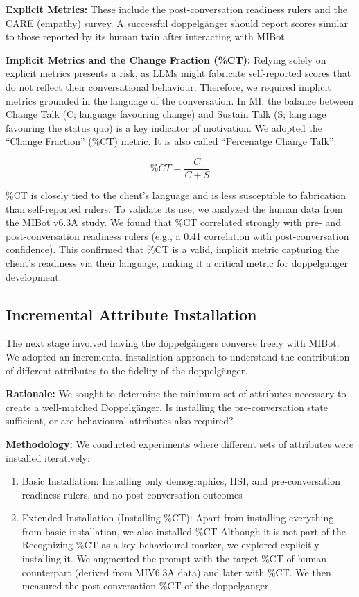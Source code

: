 \textbf{Explicit Metrics:} These include the post-conversation readiness rulers and the CARE (empathy) survey. A successful doppelgänger should report scores similar to those reported by its human twin after interacting with MIBot.

\textbf{Implicit Metrics and the Change Fraction (\%CT):} Relying solely on explicit metrics presents a risk, as LLMs might fabricate self-reported scores that do not reflect their conversational behaviour. Therefore, we required implicit metrics grounded in the language of the conversation. In MI, the balance between Change Talk (C; language favouring change) and Sustain Talk (S; language favouring the status quo) is a key indicator of motivation. We adopted the ``Change Fraction'' (\%CT) metric. It is also called ``Percenatge Change Talk'':

$$ \%CT = \frac{C}{C + S} $$

\%CT is closely tied to the client's language and is less susceptible to fabrication than self-reported rulers. To validate its use, we analyzed the human data from the MIBot v6.3A study. We found that \%CT correlated strongly with pre- and post-conversation readiness rulers (e.g., a 0.41 correlation with post-conversation confidence). This confirmed that \%CT is a valid, implicit metric capturing the client's readiness via their language, making it a critical metric for doppelgänger development.


\subsection{Incremental Attribute Installation}
\label{sec:incremental_installation}
The next stage involved having the doppelgängers converse freely with MIBot. We adopted an incremental installation approach to understand the contribution of different attributes to the fidelity of the doppelgänger.

\textbf{Rationale:}
We sought to determine the minimum set of attributes necessary to create a well-matched Doppelgänger. Is installing the pre-conversation state sufficient, or are behavioural attributes also required?

\textbf{Methodology:}
We conducted experiments where different sets of attributes were installed iteratively:

\begin{enumerate}
    \item Basic Installation: Installing only demographics, HSI, and pre-conversation readiness rulers, and no post-conversation outcomes
    \item Extended Installation (Installing \%CT): Apart from installing everything from basic installation, we also installed \%CT Although it is not part of the Recognizing \%CT as a key behavioural marker, we explored explicitly installing it. We augmented the prompt with the target \%CT of human counterpart (derived from MIV6.3A data) and later with \%CT. We then measured the post-conversation \%CT of the doppelganger. 
\end{enumerate}


